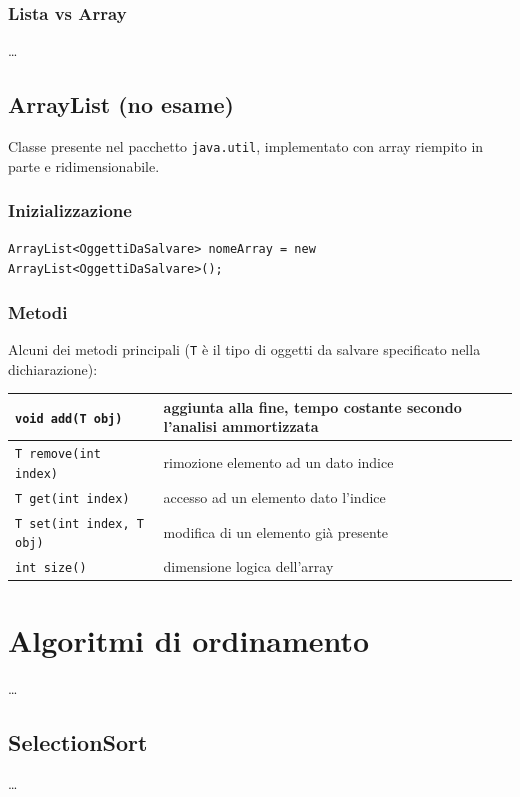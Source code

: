 \documentclass[a4paper]{article}
\begin{document}
\subsubsection*{Lista vs Array}
\dots

\subsection{ArrayList (no esame)}
Classe presente nel pacchetto \verb|java.util|, implementato con array riempito in parte e ridimensionabile.

\subsubsection*{Inizializzazione}
\verb|ArrayList<OggettiDaSalvare> nomeArray = new ArrayList<OggettiDaSalvare>();|

\subsubsection*{Metodi}
Alcuni dei metodi principali (\verb|T| è il tipo di oggetti da salvare specificato nella dichiarazione):

\begin{center}
	\begin{tabularx}{\textwidth}{l X}
		\toprule
		\verb|void add(T obj)| & aggiunta alla fine, tempo costante secondo l'analisi ammortizzata \\
		\midrule
		\verb|T remove(int index)| & rimozione elemento ad un dato indice \\
		\midrule
		\verb|T get(int index)| & accesso ad un elemento dato l'indice \\
		\midrule
		\verb|T set(int index, T obj)| & modifica di un elemento già presente \\
		\midrule
		\verb|int size()| & dimensione logica dell'array \\
		\bottomrule
	\end{tabularx}
\end{center}

\newpage


\section{Algoritmi di ordinamento}
\dots

\subsection{SelectionSort}
\dots
\end{document}
